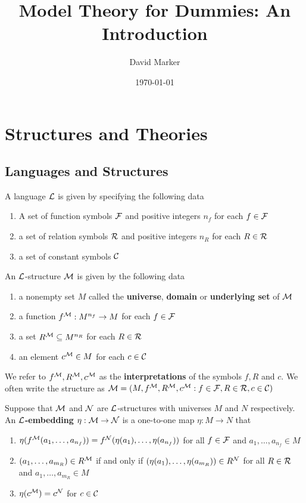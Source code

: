 \documentclass[11pt]{article}
\author{David Marker}
\date{\today}
\title{Model Theory for Dummies: An Introduction}
\begin{document}
\maketitle
\tableofcontents

\section{Structures and Theories}
\label{sec:org976f734}
\subsection{Languages and Structures}
\label{sec:orgfb1aafb}
\begin{definition}[]
A language \(\mathcal{L}\) is given by specifying the following data
\begin{enumerate}
\item A set of function symbols \(\mathcal{F}\) and positive integers \(n_f\) for each
\(f\in\mathcal{F}\)
\item a set of relation symbols \(\mathcal{R}\) and positive integers \(n_R\) for each
\(R\in\mathcal{R}\)
\item a set of constant symbols \(\mathcal{C}\)
\end{enumerate}
\end{definition}

\begin{definition}[]
An \(\mathcal{L}\)-structure \(\mathcal{M}\) is given by the following data
\begin{enumerate}
\item a nonempty set \(M\) called the \textbf{universe}, \textbf{domain} or \textbf{underlying set}
of \(\mathcal{M}\)
\item a function \(f^{\mathcal{M}}:M^{n_f}\to M\) for each \(f\in\mathcal{F}\)
\item a set \(R^{\mathcal{M}}\subseteq M^{n_R}\) for each \(R\in\mathcal{R}\)
\item an element \(c^{\mathcal{M}}\in M\) for each \(c\in\mathcal{C}\)
\end{enumerate}
\end{definition}

We refer to \(f^{\mathcal{M}},R^{\mathcal{M}},c^{\mathcal{M}}\) as the \textbf{interpretations} of the
symbols \(f,R\) and \(c\). We often write the structure as
\(\mathcal{M}=(M,f^{\mathcal{M}},R^{\mathcal{M}},c^{\mathcal{M}}:f\in\mathcal{F},R\in\mathcal{R},c\in\mathcal{C})\)

\begin{definition}[]
Suppose that \(\mathcal{M}\) and \(\mathcal{N}\) are \(\mathcal{L}\)-structures with universes \(M\)
and \(N\) respectively. An \textbf{\(\mathcal{L}\)-embedding} \(\eta:\mathcal{M}\to\mathcal{N}\) is a
one-to-one map \(\eta:M\to N\) that
\begin{enumerate}
\item \(\eta(f^{\mathcal{M}}(a_1,\dots,a_{n_f}))=f^{\mathcal{N}}(\eta(a_1),\dots,\eta(a_{n_f}))\)
for all \(f\in\mathcal{F}\) and \(a_1,\dots,a_{n_f}\in M\)
\item \((a_1,\dots,a_{m_R})\in R^{\mathcal{M}}\) if and only if
\((\eta(a_1),\dots,\eta(a_{m_R}))\in R^{\mathcal{N}}\) for all \(R\in\mathcal{R}\) and
\(a_1,\dots,a_{m_R}\in M\)
\item \(\eta(c^{\mathcal{M}})=c^{\mathcal{N}}\) for \(c\in\mathcal{C}\)
\end{enumerate}
\end{definition}
\end{document}
